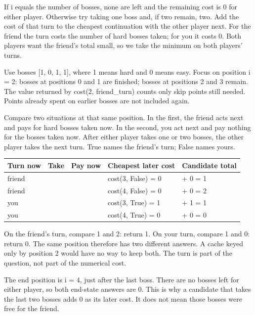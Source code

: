 \documentclass[11pt,a4paper,oneside]{report}
\begin{document}
If i equals the number of bosses, none are left and the remaining cost is 0 for either player. Otherwise try taking one boss and, if two remain, two. Add the cost of that turn to the cheapest continuation with the other player next. For the friend the turn costs the number of hard bosses taken; for you it costs 0. Both players want the friend's total small, so we take the minimum on both players' turns.

Use bosses [1, 0, 1, 1], where 1 means hard and 0 means easy. Focus on position i = 2: bosses at positions 0 and 1 are finished; bosses at positions 2 and 3 remain. The value returned by cost(2, friend\_turn) counts only skip points still needed. Points already spent on earlier bosses are not included again.

Compare two situations at that same position. In the first, the friend acts next and pays for hard bosses taken now. In the second, you act next and pay nothing for the bosses taken now. After either player takes one or two bosses, the other player takes the next turn. True names the friend's turn; False names yours.

\par\medskip\begingroup\small\setlength{\tabcolsep}{4pt}\renewcommand{\arraystretch}{1.3}\begin{tabularx}{\linewidth}{>{\raggedright\arraybackslash}X>{\raggedright\arraybackslash}X>{\raggedright\arraybackslash}X>{\raggedright\arraybackslash}X>{\raggedright\arraybackslash}X}\toprule\textbf{Turn now} & \textbf{Take} & \textbf{Pay now} & \textbf{Cheapest later cost} & \textbf{Candidate total}\\\midrule
{}friend & 1 & 1 & cost(3, False) = 0 & 1 + 0 = 1\\
{}friend & 2 & 2 & cost(4, False) = 0 & 2 + 0 = 2\\
{}you & 1 & 0 & cost(3, True) = 1 & 0 + 1 = 1\\
{}you & 2 & 0 & cost(4, True) = 0 & 0 + 0 = 0\\
\bottomrule\end{tabularx}\endgroup\par\medskip
On the friend's turn, compare 1 and 2: return 1. On your turn, compare 1 and 0: return 0. The same position therefore has two different answers. A cache keyed only by position 2 would have no way to keep both. The turn is part of the question, not part of the numerical cost.

The end position is i = 4, just after the last boss. There are no bosses left for either player, so both end-state answers are 0. This is why a candidate that takes the last two bosses adds 0 as its later cost. It does not mean those bosses were free for the friend.
\end{document}
